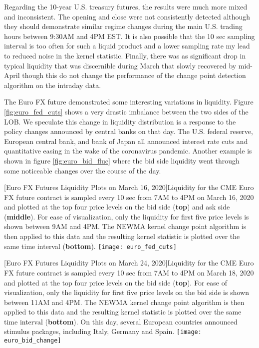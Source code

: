Regarding the 10-year U.S. treasury futures, the results were much more mixed and inconsistent. The opening and close were not consistently detected although they should demonstrate similar regime changes during the main U.S. trading hours between 9:30AM and 4PM EST. It is also possible that the 10 sec sampling interval is too often for such a liquid product and a lower sampling rate my lead to reduced noise in the kernel statistic. Finally, there was as significant drop in typical liquidity that was discernible during March that slowly recovered by mid-April though this do not change the performance of the change point detection algorithm on the intraday data. 

The Euro FX future demonstrated some interesting variations in liquidity. Figure \ref{fig:euro_fed_cuts} shows a very drastic imbalance between the two sides of the LOB. We speculate this change in liquidity distribution is a response to the policy changes announced by central banks on that day. The U.S. federal reserve, European central bank, and bank of Japan all announced interest rate cuts and quantitative easing in the wake of the coronavirus pandemic. Another example is shown in figure \ref{fig:euro_bid_fluc} where the bid side liquidity went through some noticeable changes over the course of the day. 

\begin{minipage}{0.96\textwidth}
\begin{center} 
[Euro FX Futures Liquidity Plots on March 16, 2020]{Liquidity for the CME Euro FX future contract is sampled every 10 sec from 7AM to 4PM on March 16, 2020 and plotted at the top four price levels on the bid side (\textbf{top}) and ask side (\textbf{middle}). For ease of visualization, only the liquidity for first five price levels is shown between 9AM and 4PM. The NEWMA kernel change point algorithm is then applied to this data and the resulting kernel statistic is plotted over the same time interval (\textbf{bottom}). }
\texttt{[image: euro\_fed\_cuts]} 
\label{fig:euro_fed_cuts} 
\end{center}
\end{minipage}

\begin{minipage}{0.96\textwidth}
\begin{center} 
[Euro FX Futures Liquidity Plots on March 24, 2020]{Liquidity for the CME Euro FX future contract is sampled every 10 sec from 7AM to 4PM on March 18, 2020 and plotted at the top four price levels on the bid side (\textbf{top}). For ease of visualization, only the liquidity for first five price levels on the bid side is shown between 11AM and 4PM. The NEWMA kernel change point algorithm is then applied to this data and the resulting kernel statistic is plotted over the same time interval (\textbf{bottom}). On this day, several European countries announced stimulus packages, including Italy, Germany and Spain.}
\texttt{[image: euro\_bid\_change]} 
\label{fig:euro_bid_fluc} 
\end{center}
\end{minipage}

